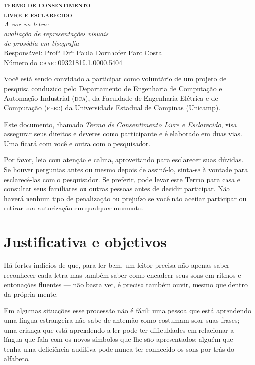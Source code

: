 \documentclass[a4paper,11pt,titlepage,singlespacing]{article}
\begin{document}
	\begin{center}
		\textbf{\Large{\textsc{termo de consentimento \\ livre e esclarecido}}}\\
        \vspace{5pt}
        {\Large\textit{A voz na letra: \\ avaliação de representações visuais \\ de prosódia em tipografia \\ }}
        \vspace{10pt}
        Responsável: Profª Drª Paula Dornhofer Paro Costa\\
        Número do \textsc{caae}: 09321819.1.0000.5404\\
        \vspace{15pt}
	\end{center}

\noindent Você está sendo convidado a participar como voluntário de um projeto de pesquisa conduzido pelo Departamento de Engenharia de Computação e Automação Industrial (\textsc{dca}), da Faculdade de Engenharia Elétrica e de Computação (\textsc{feec}) da Universidade Estadual de Campinas (Unicamp).

Este documento, chamado \textit{Termo de Consentimento Livre e Esclarecido}, visa assegurar seus direitos e deveres como participante e é elaborado em duas vias. Uma ficará com você e outra com o pesquisador.

Por favor, leia com atenção e calma, aproveitando para esclarecer suas dúvidas. Se houver perguntas antes ou mesmo depois de assiná-lo, sinta-se à vontade para esclarecê-las com o pesquisador. Se preferir, pode levar este Termo para casa e consultar seus familiares ou outras pessoas antes de decidir participar. Não haverá nenhum tipo de penalização ou prejuízo se você não aceitar participar ou retirar sua autorização em qualquer momento.


\section*{Justificativa e objetivos}

\noindent Há fortes indícios de que, para ler bem, um leitor precisa não apenas saber reconhecer cada letra mas também saber como encadear seus sons em ritmos e entonações fluentes — não basta ver, é preciso também ouvir, mesmo que dentro da própria mente. 

Em algumas situações esse processão não é fácil: uma pessoa que está aprendendo uma língua estrangeira não sabe de antemão como costumam soar suas frases; uma criança que está aprendendo a ler pode ter dificuldades em relacionar a língua que fala com os novos símbolos que lhe são apresentados; alguém que tenha uma deficiência auditiva pode nunca ter conhecido os sons por trás do alfabeto.
\end{document}
